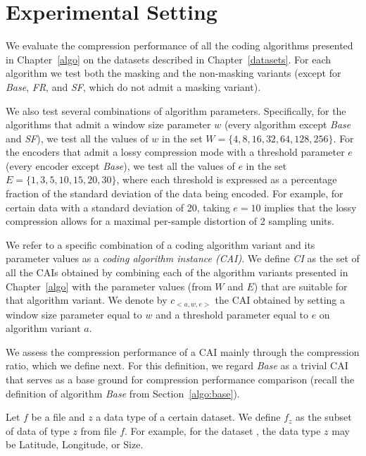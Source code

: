 
\section{Experimental Setting}
\label{experiments:experiments}


We evaluate the compression performance of all the coding algorithms presented in Chapter~\ref{algo} on the datasets described in Chapter~\ref{datasets}. For each algorithm we test both the masking and the non-masking variants (except for \textit{Base}, \textit{FR}, and \textit{SF}, which do not admit a masking variant).


We also test several combinations of algorithm parameters. Specifically, for the algorithms that admit a window size parameter $w$ (every algorithm except \textit{Base} and \textit{SF}), we test all the values of $w$ in the set $W = \{4, 8, 16, 32, 64, 128, 256\}$. For the encoders that admit a lossy compression mode with a threshold parameter $e$ (every encoder except \textit{Base}), we test all the values of $e$ in the set $E= \{1, 3, 5, 10, 15, 20, 30\}$, where each threshold is expressed as a percentage fraction of the standard deviation of the data being encoded. For example, for certain data with a standard deviation of 20, taking $e=10$ implies that the lossy compression allows for a maximal per-sample distortion of 2 sampling units.


\vspace{+5pt}
\begin{defcion}
We refer to a specific combination of a coding algorithm variant and its parameter values as a \textit{coding algorithm instance (CAI)}. We define \textit{CI} as the set of all the CAIs obtained by combining each of the algorithm variants presented in Chapter~\ref{algo} with the parameter values (from $W$ and $E$) that are suitable for that algorithm variant. We denote by $c_{<a, w, e>}$ the CAI obtained by setting a window size parameter equal to $w$ and a threshold parameter equal to $e$ on algorithm variant $a$.
\end{defcion}


\clearpage


We assess the compression performance of a CAI mainly through the compression ratio, which we define next. For this definition, we regard \textit{Base} as a trivial CAI that serves as a base ground for compression performance comparison (recall the definition of algorithm \textit{Base} from Section~\ref{algo:base}).


\vspace{+5pt}
\begin{defcion}
Let $f$ be a file and $z$ a data type of a certain dataset. We define $f_z$ as the subset of data of type $z$ from file $f$. For example, for the dataset \datasethail, the data type $z$ may be Latitude, Longitude, or Size.
\end{defcion}


